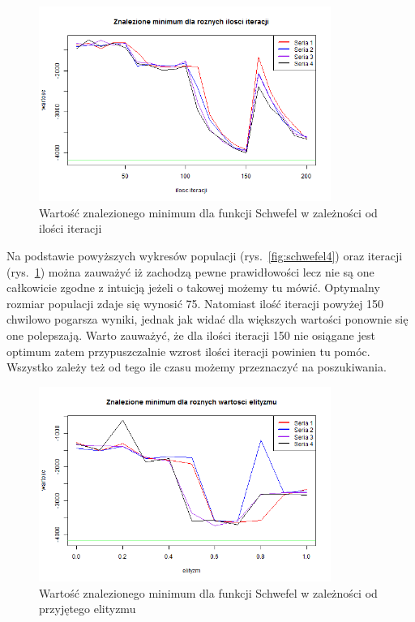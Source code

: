 \documentclass[11pt, a4paper]{article}
\newcommand{\fbi}{\leavevmode{\parindent=1em\indent}}
\begin{document}
\begin{figure}[H]
	\begin{center}
		\includegraphics[width=0.85\textwidth]{./assets/Schwefel5.png}
		\caption{Wartość znalezionego minimum dla funkcji Schwefel w zależności od ilości iteracji}
		\label{fig:schwefel5}
	\end{center}
\end{figure}

\fbi
Na podstawie powyższych wykresów populacji (rys.~\ref{fig:schwefel4}) oraz iteracji (rys.~\ref{fig:schwefel5}) można zauważyć iż zachodzą pewne prawidłowości lecz nie są one całkowicie zgodne z intuicją jeżeli o takowej możemy tu mówić. Optymalny rozmiar populacji zdaje się wynosić 75. Natomiast ilość iteracji powyżej 150 chwilowo pogarsza wyniki, jednak jak widać dla większych wartości ponownie się one polepszają. Warto zauważyć, że dla ilości iteracji 150 nie osiągane jest optimum zatem przypuszczalnie wzrost ilości iteracji powinien tu pomóc. Wszystko zależy też od tego ile czasu możemy przeznaczyć na poszukiwania.

\begin{figure}[H]
	\begin{center}
		\includegraphics[width=0.85\textwidth]{./assets/Schwefel6.png}
		\caption{Wartość znalezionego minimum dla funkcji Schwefel w zależności od przyjętego elityzmu}
		\label{fig:schwefel6}
	\end{center}
\end{figure}
\end{document}
